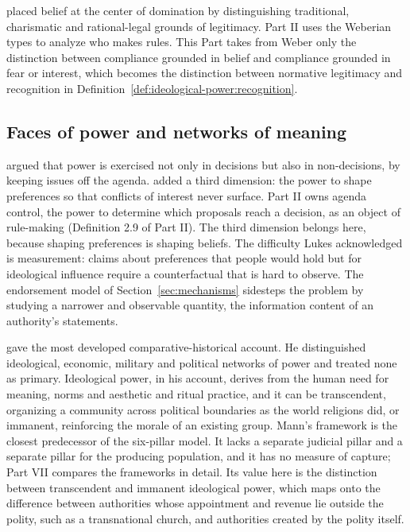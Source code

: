 \documentclass[11pt,letterpaper]{article}
\theoremstyle{definition}
\theoremstyle{remark}
\begin{document}
\citet{weber1978} placed belief at the center of domination by distinguishing traditional, charismatic and rational-legal grounds of legitimacy. Part II uses the Weberian types to analyze who makes rules. This Part takes from Weber only the distinction between compliance grounded in belief and compliance grounded in fear or interest, which becomes the distinction between normative legitimacy and recognition in Definition~\ref{def:ideological-power:recognition}.

\subsection{Faces of power and networks of meaning}

\citet{bachrach1962} argued that power is exercised not only in decisions but also in non-decisions, by keeping issues off the agenda. \citet{lukes2005} added a third dimension: the power to shape preferences so that conflicts of interest never surface. Part II owns agenda control, the power to determine which proposals reach a decision, as an object of rule-making (Definition 2.9 of Part II). The third dimension belongs here, because shaping preferences is shaping beliefs. The difficulty Lukes acknowledged is measurement: claims about preferences that people would hold but for ideological influence require a counterfactual that is hard to observe. The endorsement model of Section~\ref{sec:mechanisms} sidesteps the problem by studying a narrower and observable quantity, the information content of an authority's statements.

\citet{mann1986,mann1993} gave the most developed comparative-historical account. He distinguished ideological, economic, military and political networks of power and treated none as primary. Ideological power, in his account, derives from the human need for meaning, norms and aesthetic and ritual practice, and it can be transcendent, organizing a community across political boundaries as the world religions did, or immanent, reinforcing the morale of an existing group. Mann's framework is the closest predecessor of the six-pillar model. It lacks a separate judicial pillar and a separate pillar for the producing population, and it has no measure of capture; Part VII compares the frameworks in detail. Its value here is the distinction between transcendent and immanent ideological power, which maps onto the difference between authorities whose appointment and revenue lie outside the polity, such as a transnational church, and authorities created by the polity itself.
\end{document}
